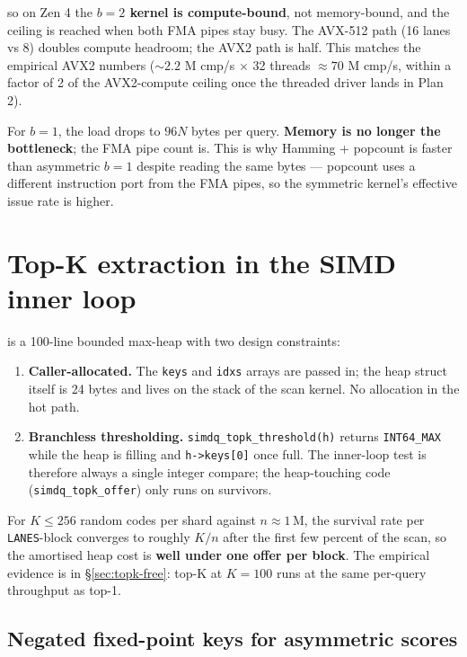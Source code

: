 \documentclass[11pt,a4paper]{article}
\begin{document}
so on Zen 4 the \textbf{$b = 2$ kernel is compute-bound}, not
memory-bound, and the ceiling is reached when both FMA pipes stay
busy. The AVX-512 path (16 lanes vs 8) doubles compute headroom; the
AVX2 path is half. This matches the empirical AVX2 numbers
($\sim 2.2$ M cmp/s $\times$ 32 threads $\approx 70$ M cmp/s, within a
factor of 2 of the AVX2-compute ceiling once the threaded driver
lands in Plan 2).

For $b = 1$, the load drops to $96 N$ bytes per query.
\textbf{Memory is no longer the bottleneck}; the FMA pipe count is.
This is why Hamming + popcount is faster than asymmetric $b = 1$
despite reading the same bytes --- popcount uses a different
instruction port from the FMA pipes, so the symmetric kernel's
effective issue rate is higher.

\section{Top-K extraction in the SIMD inner loop}

 is a 100-line bounded max-heap with two design
constraints:

\begin{enumerate}
    \item \textbf{Caller-allocated.} The \texttt{keys} and \texttt{idxs}
    arrays are passed in; the heap struct itself is 24 bytes and lives
    on the stack of the scan kernel. No allocation in the hot path.
    \item \textbf{Branchless thresholding.}
    \texttt{simdq\_topk\_threshold(h)} returns \texttt{INT64\_MAX}
    while the heap is filling and \texttt{h->keys[0]} once full. The
    inner-loop test is therefore always a single integer compare; the
    heap-touching code (\texttt{simdq\_topk\_offer}) only runs on
    survivors.
\end{enumerate}

For $K \le 256$ random codes per shard against $n \approx 1\,\mathrm{M}$,
the survival rate per \texttt{LANES}-block converges to roughly $K /
n$ after the first few percent of the scan, so the amortised heap
cost is \textbf{well under one offer per block}. The empirical
evidence is in \S\ref{sec:topk-free}: top-K at $K = 100$ runs at the
same per-query throughput as top-1.

\subsection{Negated fixed-point keys for asymmetric scores}
\end{document}
